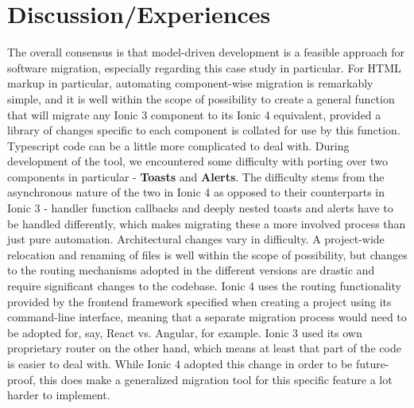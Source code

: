 \documentclass[conference]{IEEEtran}
\begin{document}
\section{Discussion/Experiences}
The overall consensus is that model-driven development is a feasible approach
for software migration, especially regarding this case study in particular.
\newline \newline
For HTML markup in particular, automating component-wise migration is remarkably simple, and it
is well within the scope of possibility to create a general function that will migrate any Ionic
3 component to its Ionic 4 equivalent, provided a library of changes specific to each component
is collated for use by this function.
\newline \newline
Typescript code can be a little more complicated to deal with. During development of the tool,
we encountered some difficulty with porting over two components in particular - \textbf{Toasts} and
\textbf{Alerts}. The difficulty stems from the asynchronous nature of the two in Ionic 4 as opposed to their
counterparts in Ionic 3 - handler function callbacks and deeply nested toasts and alerts have to be handled differently,
which makes migrating these a more involved process than just pure automation.
\newline \newline
Architectural changes vary in difficulty. A project-wide relocation and renaming of files is well within the
scope of possibility, but changes to the routing mechanisms adopted in the different versions are drastic and
require significant changes to the codebase. Ionic 4 uses the routing functionality provided by the frontend framework
specified when creating a project using its command-line interface, meaning that a separate migration process would need
to be adopted for, say, React vs. Angular, for example. Ionic 3 used its own proprietary router on the other hand, which means
at least that part of the code is easier to deal with. While Ionic 4 adopted this change in order to be future-proof, this does
make a generalized migration tool for this specific feature a lot harder to implement.

\end{document}
